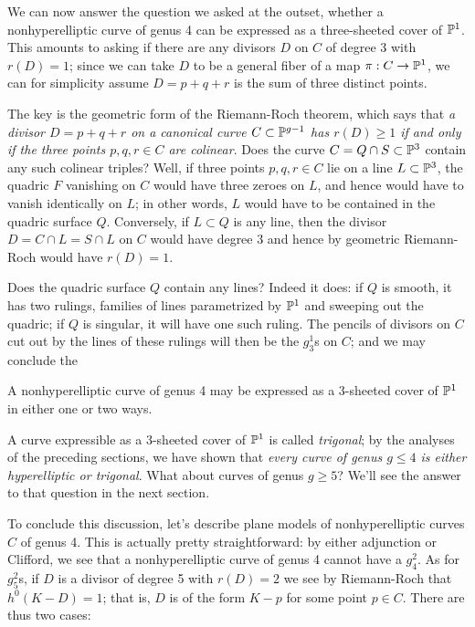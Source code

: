 \documentclass[12pt, leqno]{article}
\begin{document}
We can now answer the question we asked at the outset, whether a nonhyperelliptic curve of genus 4 can be expressed as a three-sheeted cover of ${\mathbb P}^1$. This amounts to asking if there are any divisors $D$ on $C$ of degree 3 with $r(D) = 1$; since we can take $D$ to be a general fiber of a map $\pi : C \to {\mathbb P}^1$, we can for simplicity assume $D = p+q+r$ is the sum of three distinct points.

The key is the geometric form of the Riemann-Roch theorem, which says that \emph{a divisor $D = p+q+r$ on a canonical curve $C \subset {\mathbb P}^{g-1}$ has $r(D) \geq 1$ if and only if the three points $p,q,r \in C$ are colinear}. Does the curve $C = Q \cap S \subset {\mathbb P}^3$ contain any such colinear triples?  Well, if three points $p,q,r \in C$ lie on a line $L \subset {\mathbb P}^3$, the quadric $F$ vanishing on $C$ would have three zeroes on $L$, and hence would have to vanish identically on $L$; in other words, $L$ would have to be contained in the quadric surface $Q$. Conversely,  if $L \subset Q$ is any line, then the divisor $D = C \cap L = S \cap L$ on $C$ would have degree  3 and hence by geometric Riemann-Roch would have $r(D) = 1$.

Does the quadric surface $Q$ contain any lines? Indeed it does: if $Q$ is smooth, it has two rulings, families of lines parametrized by ${\mathbb P}^1$ and sweeping out the quadric; if $Q$ is singular, it will have one such ruling. The pencils of divisors on $C$ cut out by the lines of these rulings will then be the $g^1_3$s on $C$; and we may conclude the

\begin{proposition}\label{genus 4 trigonal}
A nonhyperelliptic curve of genus 4 may be expressed as a 3-sheeted cover of ${\mathbb P}^1$ in either one or two ways.  
\end{proposition}

A curve expressible as a 3-sheeted cover of ${\mathbb P}^1$ is called \emph{trigonal}; by the analyses of the preceding sections, we have shown that \emph{every curve of genus $g \leq 4$ is either hyperelliptic or trigonal}. 
What about curves of genus $g \geq 5$? We'll see the answer to that question in the next section.

To conclude this discussion, let's describe plane models of nonhyperelliptic curves $C$ of genus 4. This is actually pretty straightforward: by either adjunction or Clifford, we see that a nonhyperelliptic curve of genus 4 cannot have a $g^2_4$. As for $g^2_5$s, if $D$ is a divisor of degree 5 with $r(D)=2$ we see by Riemann-Roch that $h^0(K-D) = 1$; that is, $D$ is of the form $K-p$ for some point $p \in C$.  There are thus two cases:
\end{document}
